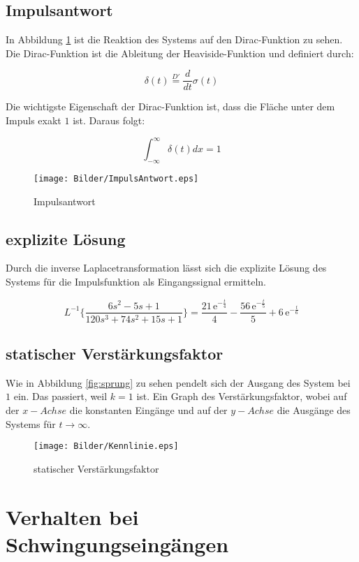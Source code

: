 \subsection{Impulsantwort}

In Abbildung \ref{fig:impuls} ist die Reaktion des Systems auf den Dirac-Funktion zu sehen. Die Dirac-Funktion ist die Ableitung der Heaviside-Funktion und definiert durch:

\[
    \delta (t) \stackrel{D'}{=} \frac{d}{dt} \sigma (t)
\]

Die wichtigste Eigenschaft der Dirac-Funktion ist, dass die Fläche unter dem Impuls exakt $1$ ist. Daraus folgt:

\[
    \int_{-\infty}^\infty \delta (t) dx = 1
\]

\begin{figure}[H]
    \label{fig:impuls}
    \centering
    \texttt{[image: Bilder/ImpulsAntwort.eps]}
    \caption{Impulsantwort}
\end{figure}

\subsection{explizite Lösung}

Durch die inverse Laplacetransformation lässt sich die explizite Lösung des Systems für die Impulsfunktion als Eingangssignal ermitteln.

\[
    L^{-1}\{\frac{6s^2 - 5s + 1}{120s^3 + 74s^2 + 15s +1}\} = \frac{21\,{\mathrm{e}}^{-\frac{t}{4}}}{4}-\frac{56\,{\mathrm{e}}^{-\frac{t}{5}}}{5}+6\,{\mathrm{e}}^{-\frac{t}{6}}
\]


\subsection{statischer Verstärkungsfaktor}

Wie in Abbildung \ref{fig:sprung} zu sehen pendelt sich der Ausgang des System bei $1$ ein. Das passiert, weil $ k = 1$ ist.
Ein Graph des Verstärkungsfaktor, wobei auf der $x-Achse$ die konstanten Eingänge und auf der $y-Achse$ die Ausgänge des Systems für $t \rightarrow \infty$.

\begin{figure}[H]
    \label{fig:Kennline}
    \centering
    \texttt{[image: Bilder/Kennlinie.eps]}
    \caption{statischer Verstärkungsfaktor}
\end{figure}


\section{Verhalten bei Schwingungseingängen}

